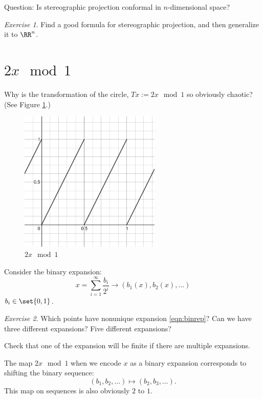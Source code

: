 \documentclass{article}
\theoremstyle{remark}
\newtheorem{exercise}{Exercise}
\begin{document}
Question: Is stereographic projection conformal in $n$-dimensional
space?

\begin{exercise}
    Find a good formula for stereographic projection, and
    then generalize it to $\RR^n$.
\end{exercise}

\section{$2x\mod{1}$}

Why is the transformation of the circle, 
$Tx:=2x \mod{1}$ so obviously chaotic? (See Figure
\ref{fig:2x-mod-1}.)
\begin{figure}
    \centering
    \includegraphics[width=0.6\textwidth]{desmos-graph-2x-mod-1.png}
    \caption{$2x\mod{1}$}
    \label{fig:2x-mod-1}
\end{figure}


Consider the binary expansion:
\[\label{eqn:binrep}\tag{*}
    x=\sum_{i=1}^\infty \frac{b_i}{2^i} \to (b_1(x),b_2(x),\ldots)\]
$b_i\in\set{0,1}$.

\begin{exercise}
    Which points have nonunique expansion \eqref{eqn:binrep}? 
    Can we have three different expansions? Five different
    expansions?

    Check that one of the expansion will be finite if 
    there are multiple expansions.
\end{exercise}

The map $2x\mod{1}$ when we encode $x$ as a binary expansion
corresponds to shifting the binary sequence:
\[ (b_1,b_2,\ldots) \mapsto (b_2,b_3,\ldots).\]
This map on sequences is also obviously $2$ to $1$.
\end{document}
